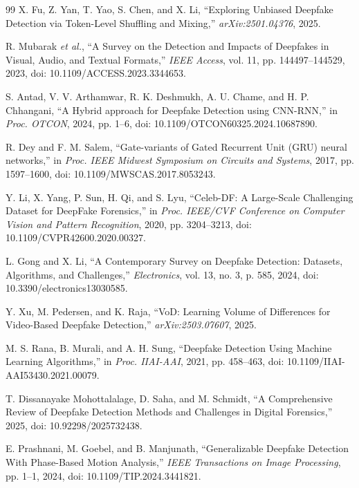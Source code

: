 \begin{thebibliography}{99}
X. Fu, Z. Yan, T. Yao, S. Chen, and X. Li, ``Exploring Unbiased Deepfake Detection via Token-Level Shuffling and Mixing,'' \emph{arXiv:2501.04376}, 2025.

R. Mubarak \emph{et al.}, ``A Survey on the Detection and Impacts of Deepfakes in Visual, Audio, and Textual Formats,'' \emph{IEEE Access}, vol. 11, pp. 144497--144529, 2023, doi: 10.1109/ACCESS.2023.3344653.

S. Antad, V. V. Arthamwar, R. K. Deshmukh, A. U. Chame, and H. P. Chhangani, ``A Hybrid approach for Deepfake Detection using CNN-RNN,'' in \emph{Proc. OTCON}, 2024, pp. 1--6, doi: 10.1109/OTCON60325.2024.10687890.

R. Dey and F. M. Salem, ``Gate-variants of Gated Recurrent Unit (GRU) neural networks,'' in \emph{Proc. IEEE Midwest Symposium on Circuits and Systems}, 2017, pp. 1597--1600, doi: 10.1109/MWSCAS.2017.8053243.

Y. Li, X. Yang, P. Sun, H. Qi, and S. Lyu, ``Celeb-DF: A Large-Scale Challenging Dataset for DeepFake Forensics,'' in \emph{Proc. IEEE/CVF Conference on Computer Vision and Pattern Recognition}, 2020, pp. 3204--3213, doi: 10.1109/CVPR42600.2020.00327.

L. Gong and X. Li, ``A Contemporary Survey on Deepfake Detection: Datasets, Algorithms, and Challenges,'' \emph{Electronics}, vol. 13, no. 3, p. 585, 2024, doi: 10.3390/electronics13030585.

Y. Xu, M. Pedersen, and K. Raja, ``VoD: Learning Volume of Differences for Video-Based Deepfake Detection,'' \emph{arXiv:2503.07607}, 2025.

M. S. Rana, B. Murali, and A. H. Sung, ``Deepfake Detection Using Machine Learning Algorithms,'' in \emph{Proc. IIAI-AAI}, 2021, pp. 458--463, doi: 10.1109/IIAI-AAI53430.2021.00079.

T. Dissanayake Mohottalalage, D. Saha, and M. Schmidt, ``A Comprehensive Review of Deepfake Detection Methods and Challenges in Digital Forensics,'' 2025, doi: 10.92298/2025732438.

E. Prashnani, M. Goebel, and B. Manjunath, ``Generalizable Deepfake Detection With Phase-Based Motion Analysis,'' \emph{IEEE Transactions on Image Processing}, pp. 1--1, 2024, doi: 10.1109/TIP.2024.3441821.


\end{thebibliography}

